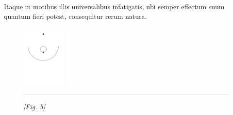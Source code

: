 \pstart
Itaque in motibus illis universalibus infatigatis, ubi semper effectum suum quantum fieri potest, consequitur rerum natura.\hfill \\
\begin{figure}
\includegraphics[width=0.2\textwidth]{images/lh0351303_035r-d5.pdf}\\
\rule[0cm]{5mm}{0cm}\textit{[Fig. 5]}
\end{figure}
\pend
 


